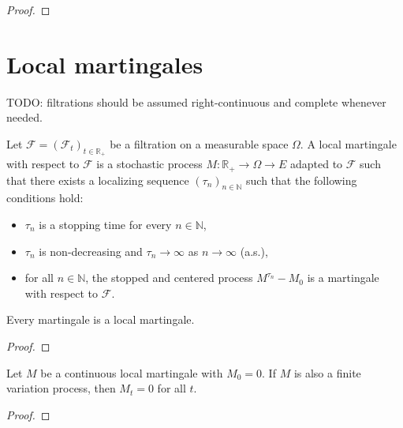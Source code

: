 \begin{proof}

\end{proof}


\section{Local martingales}

TODO: filtrations should be assumed right-continuous and complete whenever needed.

\begin{definition}\label{def:IsLocalMartingale}
Let $\mathcal{F} = (\mathcal{F}_t)_{t \in \mathbb{R}_+}$ be a filtration on a measurable space $\Omega$.
A local martingale with respect to $\mathcal{F}$ is a stochastic process $M : \mathbb{R}_+ \to \Omega \to E$ adapted to $\mathcal{F}$ such that there exists a localizing sequence $(\tau_n)_{n \in \mathbb{N}}$ such that the following conditions hold:
\begin{itemize}
  \item $\tau_n$ is a stopping time for every $n \in \mathbb{N}$,
  \item $\tau_n$ is non-decreasing and $\tau_n \to \infty$ as $n \to \infty$ (a.s.),
  \item for all $n \in \mathbb{N}$, the stopped and centered process $M^{\tau_n} - M_0$ is a martingale with respect to $\mathcal{F}$.
\end{itemize}
\end{definition}


\begin{lemma}\label{lem:Martingale.IsLocalMartingale}
Every martingale is a local martingale.
\end{lemma}

\begin{proof}

\end{proof}


\begin{theorem}\label{thm:IsLocalMartingale.eq_zero_of_finiteVariation}
Let $M$ be a continuous local martingale with $M_0 = 0$. If $M$ is also a finite variation process, then $M_t = 0$ for all $t$.
\end{theorem}

\begin{proof}

\end{proof}


